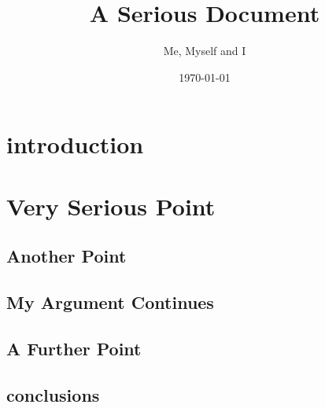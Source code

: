 \documentclass[a4paper]{report}
\title{A Serious Document}
\author{Me, Myself and I}
\date{\today}
\begin{document}
\maketitle

\tableofcontents
\pagebreak

\begin{abstract}

\end{abstract}

\chapter{introduction}


\chapter{Very Serious Point}


\section{Another Point}


\section{My Argument Continues}


\section{A Further Point}



\section{conclusions}


\appendix
\end{document}
